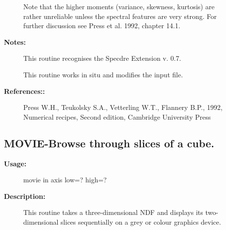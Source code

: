 \begin{description}
\begin{description}
\begin{terminalv}
   Note that the higher moments (variance, skewness, kurtosis) are
   rather unreliable unless the spectral features are very strong. For
   further discussion see Press et al. 1992, chapter 14.1.
\end{terminalv}

\item [\textbf{Notes:}]
This routine recognises the Specdre Extension v. 0.7.

This routine works in situ and modifies the input file.

\item [\textbf{References::}]
   Press W.H., Teukolsky S.A., Vetterling W.T., Flannery B.P., 1992,
   Numerical recipes, Second edition, Cambridge University Press

\end{description}
\subsection{MOVIE-\label{MOVIE}Browse through slices of a cube.}
\begin{description}

\item [\textbf{Usage:}]

   movie in axis low=? high=?


\item [\textbf{Description:}]

   This routine takes a three-dimensional NDF and displays its
   two-dimensional slices sequentially on a grey or colour graphics
   device.



\end{description}
\end{description}
